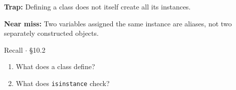 \documentclass[11pt]{article}
\begin{document}
\begin{keepsection}
\begin{notebox}\textbf{Trap:} Defining a class does not itself create all its instances.\end{notebox}

\begin{notebox}\textbf{Near miss:} Two variables assigned the same instance are aliases, not two separately constructed objects.\end{notebox}

\begin{recallbox}{Recall \ensuremath{\cdot} §10.2}
\begin{enumerate}
\item What does a class define?
\item What does \texttt{isinstance} check?
\end{enumerate}

\end{recallbox}
\end{keepsection}
\end{document}
